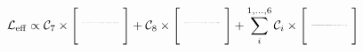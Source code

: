 \begin{equation*}
    \mathcal{L}_{\mathrm{eff}} \propto
\mathcal{C}_7 \times
\Biggl[
\raisebox{5pt}{
\resizebox{0.085\textwidth}{!}{
\feynmandiagram [small, inline=(b.base), vertical=b to d] {
    a --  b [dot] -- c,
    b -- [boson] d [particle=$\gamma$],
    };
}
}\Biggr]
+
\mathcal{C}_8 \times
\Biggl[
\raisebox{5pt}{
\resizebox{0.085\textwidth}{!}{
\feynmandiagram [small, inline=(b.base), vertical=b to d] {
    a --  b [dot] --  c,
    b -- [boson] d [particle=$g$],
    };
}
}\Biggr]
+
\sum_i^{1,...,6}
\mathcal{C}_i\times
\Biggl[
\raisebox{3pt}{
\resizebox{0.085\textwidth}{!}{
\feynmandiagram [small, inline=(b.base), horizontal=a to c] {
    a --  b [dot] --  c,
    d --  b -- e,
    };
}
}\Biggr]
\end{equation*}